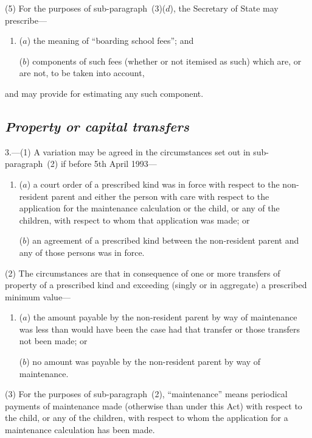 \documentclass[12pt,a4paper]{article}
\begin{document}
(5) For the purposes of sub-paragraph~(3)($d$), the Secretary of State may prescribe—
\begin{enumerate}\item[]
($a$) the meaning of “boarding school fees”; and

($b$) components of such fees (whether or not itemised as such) which are, or are not, to be taken into account,
\end{enumerate}
and may provide for estimating any such component.


\subsection*{\itshape Property or capital transfers}

3.---(1) A variation may be agreed in the circumstances set out in sub-paragraph~(2)  if before 5th April 1993—
\begin{enumerate}\item[]
($a$) a court order of a prescribed kind was in force with respect to the non-resident parent and either the person with care with respect to the application for the maintenance calculation or the child, or any of the children, with respect to whom that application was made; or

($b$) an agreement of a prescribed kind between the non-resident parent and any of those persons was in force.
\end{enumerate}

(2) The circumstances are that in consequence of one or more transfers of property of a prescribed kind and exceeding (singly or in aggregate) a prescribed minimum value—
\begin{enumerate}\item[]
($a$) the amount payable by the non-resident parent by way of maintenance was less than would have been the case had that transfer or those transfers not been made; or

($b$) no amount was payable by the non-resident parent by way of maintenance.
\end{enumerate}

(3) For the purposes of sub-paragraph~(2), “maintenance” means periodical payments of maintenance made (otherwise than under this Act) with respect to the child, or any of the children, with respect to whom the application for a maintenance calculation has been made.
\end{document}
